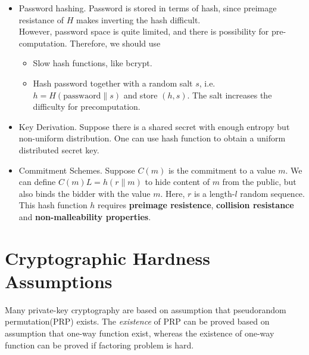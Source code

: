 \documentclass[12pt]{article}
\theoremstyle{definition}
\begin{document}
\begin{itemize}
  \item Password hashing. Password is stored in terms of hash, since preimage resistance of $H$ makes inverting the hash difficult.\\
  However, password space is quite limited, and there is possibility for pre-computation. Therefore, we should use 
  \begin{itemize}
    \item Slow hash functions, like bcrypt.
    \item Hash password together with a random salt $s$, i.e. $h=H(\text{passwaord}\| s)$ and store $(h,s)$. The salt increases the difficulty for precomputation.
  \end{itemize}
  \item Key Derivation. Suppose there is a shared secret with enough entropy but non-uniform distribution. One can use hash function to obtain a uniform distributed secret key.
  \item Commitment Schemes. Suppose $C(m)$ is the commitment to a value $m$. We can define $C(m)L=h(r\| m)$ to hide content of $m$ from the public, but also binds the bidder with the value $m$. Here, $r$ is a length-$l$ random sequence.\\
  This hash function $h$ requires \textbf{preimage resistence}, \textbf{collision resistance} and \textbf{non-malleability properties}.
\end{itemize}

\section{Cryptographic Hardness Assumptions}
Many private-key cryptography are based on assumption that pseudorandom permutation(PRP) exists. The \textit{existence} of PRP can be proved based on assumption that one-way function exist, whereas the existence of one-way function can be proved if factoring problem is hard.
\end{document}
